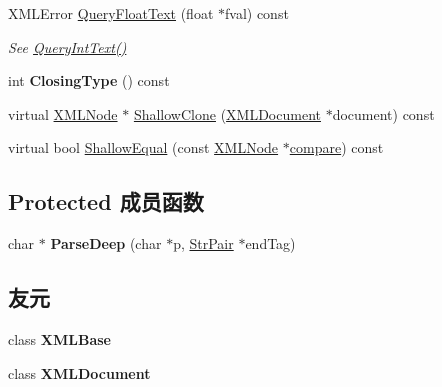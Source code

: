 \begin{DoxyCompactItemize}
\mbox{\label{classtinyxml2_1_1_x_m_l_element_afa332afedd93210daa6d44b88eb11e29}} 
X\+M\+L\+Error \hyperlink{classtinyxml2_1_1_x_m_l_element_afa332afedd93210daa6d44b88eb11e29}{Query\+Float\+Text} (float $\ast$fval) const
\begin{DoxyCompactList}\small\item\em See \hyperlink{classtinyxml2_1_1_x_m_l_element_a926357996bef633cb736e1a558419632}{Query\+Int\+Text()} \end{DoxyCompactList}\item 
\mbox{\label{classtinyxml2_1_1_x_m_l_element_ac820806b6c14af6833dcbcf0957b6d61}} 
int {\bfseries Closing\+Type} () const
\item 
virtual \hyperlink{classtinyxml2_1_1_x_m_l_node}{X\+M\+L\+Node} $\ast$ \hyperlink{classtinyxml2_1_1_x_m_l_element_aafa2807a45b28fe096b29d76e6a13b7c}{Shallow\+Clone} (\hyperlink{classtinyxml2_1_1_x_m_l_document}{X\+M\+L\+Document} $\ast$document) const
\item 
virtual bool \hyperlink{classtinyxml2_1_1_x_m_l_element_a61ffd7bf918a9db4aa6203d855ac5ec2}{Shallow\+Equal} (const \hyperlink{classtinyxml2_1_1_x_m_l_node}{X\+M\+L\+Node} $\ast$\hyperlink{structcompare}{compare}) const
\end{DoxyCompactItemize}
\subsection*{Protected 成员函数}
\begin{DoxyCompactItemize}
\item 
\mbox{\label{classtinyxml2_1_1_x_m_l_element_aaafdd2a5618abe80a2c1839ad3ccd492}} 
char $\ast$ {\bfseries Parse\+Deep} (char $\ast$p, \hyperlink{classtinyxml2_1_1_str_pair}{Str\+Pair} $\ast$end\+Tag)
\end{DoxyCompactItemize}
\subsection*{友元}
\begin{DoxyCompactItemize}
\item 
\mbox{\label{classtinyxml2_1_1_x_m_l_element_a449202cfc89e7ae5c2f81995476f9ec1}} 
class {\bfseries X\+M\+L\+Base}
\item 
\mbox{\label{classtinyxml2_1_1_x_m_l_element_a4eee3bda60c60a30e4e8cd4ea91c4c6e}} 
class {\bfseries X\+M\+L\+Document}
\end{DoxyCompactItemize}

